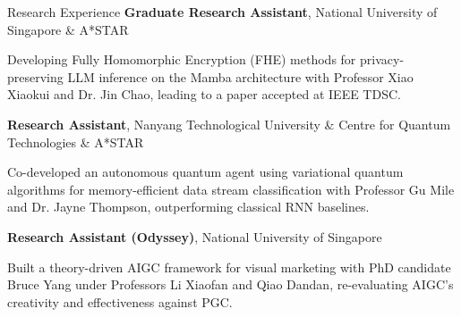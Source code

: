 \begin{rubric}{Research Experience}
    \textbf{Graduate Research Assistant}, National University of Singapore \& A*STAR\par
    Developing Fully Homomorphic Encryption (FHE) methods for privacy-preserving LLM inference on the Mamba architecture with Professor Xiao Xiaokui and Dr. Jin Chao, leading to a paper accepted at IEEE TDSC.

    \textbf{Research Assistant}, Nanyang Technological University \& Centre for Quantum Technologies \& A*STAR\par
    Co-developed an autonomous quantum agent using variational quantum algorithms for memory-efficient data stream classification with Professor Gu Mile and Dr. Jayne Thompson, outperforming classical RNN baselines.

    \textbf{Research Assistant (Odyssey)}, National University of Singapore\par
    Built a theory-driven AIGC framework for visual marketing with PhD candidate Bruce Yang under Professors Li Xiaofan and Qiao Dandan, re-evaluating AIGC's creativity and effectiveness against PGC.

\end{rubric}
